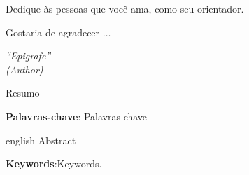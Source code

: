 \documentclass[12pt,a4paper,oneside]{abntex2}
\numberwithin{equation}{section}
\numberwithin{figure}{section}
\theoremstyle{definition}
\begin{document}

	\begin{dedicatoria}
		\vspace*{\fill}
		Dedique às pessoas que você ama, como seu orientador.
		\vspace*{\fill}
	\end{dedicatoria}
	
	\begin{agradecimentos}
		Gostaria de agradecer $\dots$
	\end{agradecimentos}

	\begin{epigrafe}
	\vspace*{\fill}
	\begin{flushright}
		\textit{``Epigrafe'' \\ (Author)}
	\end{flushright}
	\end{epigrafe}



	\begin{resumo}
		Resumo

		\vspace{\onelineskip} 
		\noindent \textbf{Palavras-chave}: Palavras chave
	\end{resumo}

\begin{resumo}[Abstract] 
	\begin{otherlanguage*}{english}
		Abstract
		
		\vspace{\onelineskip} 
		\noindent \textbf{Keywords}:Keywords.
	\end{otherlanguage*} 
\end{resumo}

\end{document}
